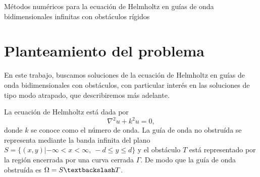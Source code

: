 \documentclass[11pt]{article}
\begin{document}
\begin{center}
{\Large Métodos numéricos para la ecuación de Helmholtz en guías de onda bidimensionales infinitas con obstáculos rígidos}
\end{center}
\section{Planteamiento del problema}
En este trabajo, buscamos soluciones de la ecuación de Helmholtz en guías de onda bidimensionales con obstáculos, con particular interés en las soluciones de tipo modo atrapado, que describiremos más adelante.

La ecuaci\'on de Helmholtz está dada por
\begin{equation}
  \label{eq:41}
  \nabla^2 u + k^2 u = 0,
\end{equation}
donde $k$ se conoce como el n\'umero de onda. La guía de onda no obstruída se representa mediante la banda infinita del plano $S = \{(x,y)| -\infty < x < \infty,~-d \le y \le d\}$ y el obstáculo $T$ está representado por la regi\'on encerrada por una curva cerrada $\Gamma$. De modo que la gu\'ia de onda obstruída es $\Omega = S \textbackslash T$. 
\end{document}
